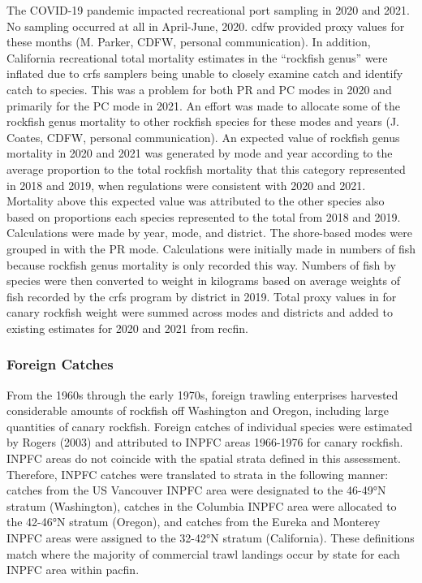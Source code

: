 \documentclass[11pt,
  english,
  letterpaper,
]{article}
\begin{document}
The COVID-19 pandemic impacted recreational port sampling in 2020 and 2021. No sampling occurred at all in April-June, 2020. \Gls{cdfw} provided proxy values for these months (M. Parker, CDFW, personal communication). In addition, California recreational total mortality estimates in the ``rockfish genus'' were inflated due to \gls{crfs} samplers being unable to closely examine catch and identify catch to species. This was a problem for both PR and PC modes in 2020 and primarily for the PC mode in 2021. An effort was made to allocate some of the rockfish genus mortality to other rockfish species for these modes and years (J. Coates, CDFW, personal communication). An expected value of rockfish genus mortality in 2020 and 2021 was generated by mode and year according to the average proportion to the total rockfish mortality that this category represented in 2018 and 2019, when regulations were consistent with 2020 and 2021. Mortality above this expected value was attributed to the other species also based on proportions each species represented to the total from 2018 and 2019. Calculations were made by year, mode, and district. The shore-based modes were grouped in with the PR mode. Calculations were initially made in numbers of fish because rockfish genus mortality is only recorded this way. Numbers of fish by species were then converted to weight in kilograms based on average weights of fish recorded by the \gls{crfs} program by district in 2019. Total proxy values in for canary rockfish weight were summed across modes and districts and added to existing estimates for 2020 and 2021 from \gls{recfin}.

\hypertarget{foreign-catches}{%
\subsubsection{Foreign Catches}\label{foreign-catches}}

From the 1960s through the early 1970s, foreign trawling enterprises harvested considerable amounts of rockfish off Washington and Oregon, including large quantities of canary rockfish. Foreign catches of individual species were estimated by Rogers (2003) and attributed to INPFC areas 1966-1976 for canary rockfish. INPFC areas do not coincide with the spatial strata defined in this assessment. Therefore, INPFC catches were translated to strata in the following manner: catches from the US Vancouver INPFC area were designated to the 46-49°N stratum (Washington), catches in the Columbia INPFC area were allocated to the 42-46°N stratum (Oregon), and catches from the Eureka and Monterey INPFC areas were assigned to the 32-42°N stratum (California). These definitions match where the majority of commercial trawl landings occur by state for each INPFC area within \gls{pacfin}.
\end{document}
